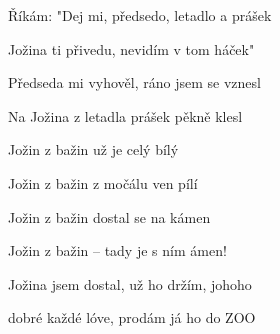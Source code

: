 \begin{song}
\bigskip


\bigskip

 \par
{}Říkám: "Dej mi, předsedo, letadlo a prášek \par
{}Jožina ti přivedu, nevidím v tom háček" \par
{}Předseda mi vyhověl, ráno jsem se vznesl \par
{}Na Jožina z letadla prášek pěkně klesl \par

\bigskip

Jožin z bažin už je celý bílý \par
{}Jožin z bažin z močálu ven pílí \par
{}Jožin z bažin dostal se na kámen \par
{}Jožin z bažin – tady je s ním ámen! \par
{}Jožina jsem dostal, už ho držím, johoho  \par
{}dobré každé lóve, prodám já ho do ZOO \par

\bigskip
{} \par
{}     \par
{}    \par

\end{song}
